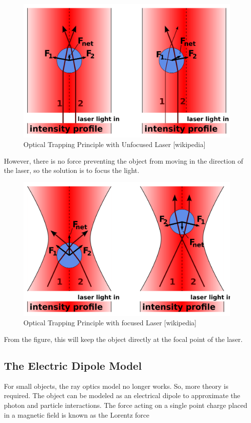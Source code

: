 \documentclass{article}
\begin{document}
\begin{figure}[h!]
    \begin{center}
    \includegraphics[width=0.5\linewidth]{Pictures/Optical_trap_unfocused.png}
    \caption{Optical Trapping Principle with Unfocused Laser [wikipedia]}
    \label{fig:unfocused}
    \end{center}
\end{figure}

However, there is no force preventing the object from moving in the direction of the laser, so the solution is to focus the light.

\begin{figure}[h!]
    \begin{center}
    \includegraphics[width=0.5\linewidth]{Pictures/Optical_trap_focused.png}
    \caption{Optical Trapping Principle with focused Laser [wikipedia]}
    \label{fig:focused}
    \end{center}
\end{figure}
\newpage
From the figure, this will keep the object directly at the focal point of the laser.


\subsection*{The Electric Dipole Model}

For small objects, the ray optics model no longer works. So, more theory is required. The object can be modeled as an electrical dipole to approximate the photon and particle interactions. The force acting on a single point charge placed in a magnetic field is known as the Lorentz force \cite{UToronto}
\end{document}
